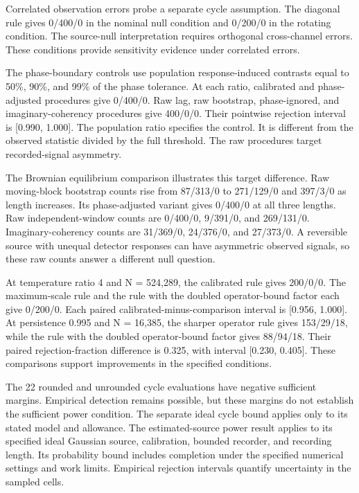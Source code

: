 Correlated observation errors probe a separate cycle assumption. The diagonal rule gives 0/400/0 in the nominal null condition and 0/200/0 in the rotating condition. The source-null interpretation requires orthogonal cross-channel errors. These conditions provide sensitivity evidence under correlated errors.

The phase-boundary controls use population response-induced contrasts equal to 50\%, 90\%, and 99\% of the phase tolerance. At each ratio, calibrated and phase-adjusted procedures give 0/400/0. Raw lag, raw bootstrap, phase-ignored, and imaginary-coherency procedures give 400/0/0. Their pointwise rejection interval is [0.990, 1.000]. The population ratio specifies the control. It is different from the observed statistic divided by the full threshold. The raw procedures target recorded-signal asymmetry.

The Brownian equilibrium comparison illustrates this target difference. Raw moving-block bootstrap counts rise from 87/313/0 to 271/129/0 and 397/3/0 as length increases. Its phase-adjusted variant gives 0/400/0 at all three lengths. Raw independent-window counts are 0/400/0, 9/391/0, and 269/131/0. Imaginary-coherency counts are 31/369/0, 24/376/0, and 27/373/0. A reversible source with unequal detector responses can have asymmetric observed signals, so these raw counts answer a different null question.

At temperature ratio 4 and N = 524,289, the calibrated rule gives 200/0/0. The maximum-scale rule and the rule with the doubled operator-bound factor each give 0/200/0. Each paired calibrated-minus-comparison interval is [0.956, 1.000]. At persistence 0.995 and N = 16,385, the sharper operator rule gives 153/29/18, while the rule with the doubled operator-bound factor gives 88/94/18. Their paired rejection-fraction difference is 0.325, with interval [0.230, 0.405]. These comparisons support improvements in the specified conditions.

The 22 rounded and unrounded cycle evaluations have negative sufficient margins. Empirical detection remains possible, but these margins do not establish the sufficient power condition. The separate ideal cycle bound applies only to its stated model and allowance. The estimated-source power result applies to its specified ideal Gaussian source, calibration, bounded recorder, and recording length. Its probability bound includes completion under the specified numerical settings and work limits. Empirical rejection intervals quantify uncertainty in the sampled cells.

